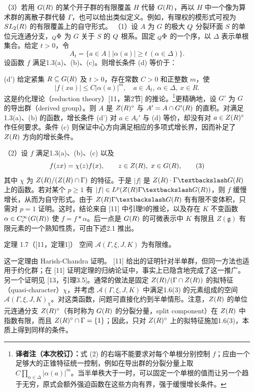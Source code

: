 （3）若用 $G(R)$ 的某个开子群的有限覆盖 $H$ 代替 $G(R)$，再以 $H$ 中一个像为算术群的离散子群代替 $\Gamma$，也可以给出类似定义。例如，有理权的模形式可视为 $SL_2(R)$ 的有限覆盖上的自守形式。
（1）设 $A$ 为 $G$ 的极大 $Q$ 分裂环面 $S$ 的单位元连通分支，${}_{Q}\Phi$ 为 $G$ 关于 $S$ 的 $Q$ 根系。固定 ${}_{Q}\Phi$ 的一个序，以 $\Delta$ 表示单根集合。给定 $t>0$，令
\[
A_t=\{a\in A\mid|\alpha(a)|\geq t\ (\alpha\in\Delta)\}.\tag{1}
\]
设函数 $f$ 满足1.3(a)、(b)、(c)。则增长条件 (d) 等价于：

(d') 给定紧集 $R\subseteq G(R)$ 及 $t>0$，存在常数 $C>0$ 和正整数 $m$，使
\[
|f(xa)|\leq C|\alpha(a)|^m,\quad a\in A_t,\ \alpha\in\Delta,\ x\in R.\tag{2}
\]
这是约化理论（reduction theory）[11，第2节] 的推论。\footnote{\textbf{译者注（本次校订）：}式 (2) 的右端不能要求对每个单根分别控制 $f$；应由一个足够大的正锥特征统一控制，例如在导出群的分裂分量上取 $C\prod_{\alpha\in\Delta}|\alpha(a)|^m$。当半单秩大于一时，可以固定一个单根的值而让另一个趋于无穷，原式会额外强迫函数在这些方向有界，强于缓慢增长条件。}更精确地，设 $G'$ 为 $G$ 的导出群（derived group）。则 $A$ 是 $Z(R)^\circ$ 与 $A'=A\cap G'(R)$ 的直积。对满足1.3(a)、(b) 的函数，增长条件 (d') 对 $a\in A_t'$ 与 (d) 等价，却没有对 $a\in Z(R)^\circ$ 作任何要求。条件 (c) 则保证中心方向满足相应的多项式增长界，因而补足了 $Z(R)$ 方向的增长条件。

（2）设 $f$ 满足1.3(a)、(b)、(c) 以及
\[
f(zx)=\chi(z)f(x),\qquad z\in Z(R),\ x\in G(R),\tag{3}
\]
其中 $\chi$ 为 $Z(R)/(Z(R)\cap\Gamma)$ 的特征。于是 $|f|$ 是 $Z(\R)\cdot\Gamma\backslash G(\R)$ 上的函数。若对某个 $p\geq1$ 有 $|f|\in L^p(Z(\R)\Gamma\backslash G(\R))$，则 $f$ 缓慢增长，从而为自守形式。由于 $Z(\R)\Gamma\backslash G(\R)$ 有有限不变体积，只需对 $p=1$ 证明。这时，结论来自 [11] 中引理9的推论，以及存在 $K$ 不变函数 $\alpha\in C_c^\infty(G(R))$ 使 $f=f*\alpha$。后一点是 $G(R)$ 的可微表示中 $K$ 有限且 $Z(\mathfrak g)$ 有限元素的一个熟知性质，可由下述2.1 推出。
\begin{originaltheorem}{定理 1.7（[11，定理1]）}
空间 $\mathcal A(\Gamma,\xi,J,K)$ 为有限维。
\end{originaltheorem}
这一定理由 Harish-Chandra 证明。 [11] 给出的证明针对半单群，但同一方法也适用于约化群；在 [11] 证明定理的归纳论证中，事实上已隐含地完成了这一推广。另一个证明见 [13，引理3.5]。通常的做法是固定 $Z(R)/(\Gamma\cap Z(R))$ 的拟特征（quasi-character）$\chi$，并考虑 $\mathcal A(\Gamma,\xi,J,K)$ 中满足1.6(3) 的元素组成的空间 $\mathcal A(\Gamma,\xi,J,K)_\chi$。对这类函数，问题可直接化约到半单情形。注意，$Z(R)$ 的单位元连通分支 $Z(R)^\circ$（有时称为 $G(R)$ 的分裂分量，split component）在 $Z(R)$ 中指数有限，而且 $Z(R)^\circ\cap\Gamma=\{1\}$；因此，只对 $Z(R)^\circ$ 上的拟特征施加1.6(3)，本质上得到同样的条件。

